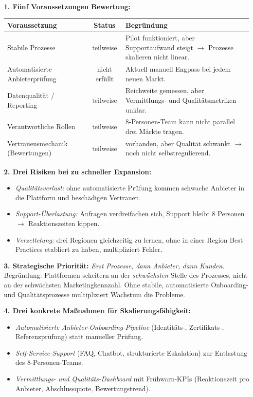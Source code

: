 \documentclass[11pt,a4paper,oneside]{article}
\begin{document}
\begin{loesungbox}
\textbf{1. Fünf Voraussetzungen \textendash{} Bewertung:}

\smallskip
\begin{tabularx}{\linewidth}{@{}lcX@{}}
\toprule
\textbf{Voraussetzung} & \textbf{Status} & \textbf{Begründung} \\
\midrule
Stabile Prozesse           & teilweise       & Pilot funktioniert, aber Supportaufwand steigt $\rightarrow$ Prozesse skalieren nicht linear. \\
\midrule
Automatisierte Anbieterprüfung & nicht erfüllt   & Aktuell manuell \textendash{} Engpass bei jedem neuen Markt. \\
\midrule
Datenqualität / Reporting & teilweise       & Reichweite gemessen, aber Vermittlungs- und Qualitätsmetriken unklar. \\
\midrule
Verantwortliche Rollen     & teilweise       & 8-Personen-Team kann nicht parallel drei Märkte tragen. \\
\midrule
Vertrauensmechanik (Bewertungen)& teilweise & vorhanden, aber Qualität schwankt $\rightarrow$ noch nicht selbstregulierend. \\
\bottomrule
\end{tabularx}

\smallskip
\textbf{2. Drei Risiken bei zu schneller Expansion:}
\begin{itemize}
  \item \emph{Qualitätsverlust:} ohne automatisierte Prüfung kommen schwache Anbieter in die Plattform und beschädigen Vertrauen.
  \item \emph{Support-Überlastung:} Anfragen verdreifachen sich, Support bleibt 8 Personen $\rightarrow$ Reaktionszeiten kippen.
  \item \emph{Verzettelung:} drei Regionen gleichzeitig zu lernen, ohne in einer Region Best Practices etabliert zu haben, multipliziert Fehler.
\end{itemize}

\textbf{3. Strategische Priorität:}
\emph{Erst Prozesse, dann Anbieter, dann Kunden.} Begründung: Plattformen scheitern an der \emph{schwächsten} Stelle des Prozesses, nicht an der schwächsten Marketingkennzahl. Ohne stabile, automatisierte Onboarding- und Qualitätsprozesse multipliziert Wachstum die Probleme.

\textbf{4. Drei konkrete Maßnahmen für Skalierungsfähigkeit:}
\begin{itemize}
  \item \emph{Automatisierte Anbieter-Onboarding-Pipeline} (Identitäts-, Zertifikats-, Referenzprüfung) statt manueller Prüfung.
  \item \emph{Self-Service-Support} (FAQ, Chatbot, strukturierte Eskalation) zur Entlastung des 8-Personen-Teams.
  \item \emph{Vermittlungs- und Qualitäts-Dashboard} mit Frühwarn-KPIs (Reaktionszeit pro Anbieter, Abschlussquote, Bewertungstrend).
\end{itemize}


\end{loesungbox}
\end{document}
